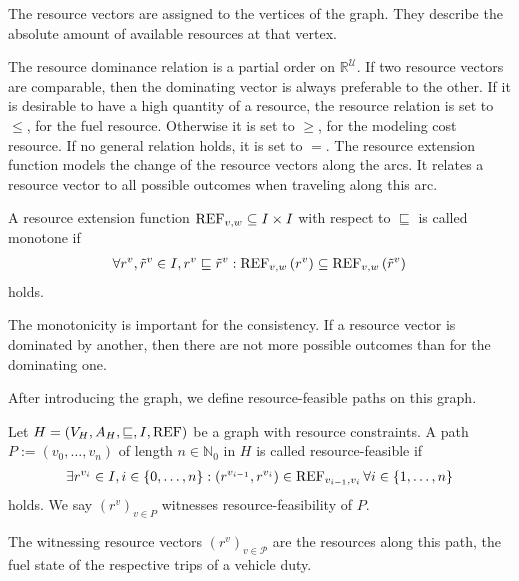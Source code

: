 The resource vectors are assigned to the vertices of the graph. They describe the absolute amount of available resources at that vertex.

The resource dominance relation is a partial order on $\mathbb{R}^{\mathcal{U}}$. If two resource vectors are comparable, then the dominating vector is always preferable to the other. If it is desirable to have a high quantity of a resource, the resource relation is set to $\leq$, \eg for the fuel resource. Otherwise it is set to $\geq$, \eg for the modeling cost resource. If no general relation holds, it is set to $=$. The resource extension function models the change of the resource vectors along the arcs. It relates a resource vector to all possible outcomes when traveling along this arc. 

\begin{definition}
\label{def:monotone_ref}

A resource extension function ${\operatorname{REF}_{v,w}\subseteq I\times I}$ with respect to $\sqsubseteq$ is called monotone if
\begin{align*}
	\forall r^v,\tilde{r}^v\in I, r^v\sqsubseteq\tilde{r}^v : \operatorname{REF}_{v,w}\left(r^v\right)\subseteq\operatorname{REF}_{v,w}\left(\tilde{r}^v\right)
\end{align*}
holds.

\end{definition}

The monotonicity is important for the consistency. If a resource vector is dominated by another, then there are not more possible outcomes than for the dominating one.

After introducing the graph, we define resource-feasible paths on this graph.

\begin{definition}

Let ${H=\left(V_H,A_H,\sqsubseteq,I,\operatorname{REF}\right)}$ be a graph with resource constraints. A path ${P:=\left(v_0,\dots,v_n\right)}$ of length ${n\in\mathbb{N}_0}$ in $H$ is called resource-feasible if
\begin{align*}
	\exists r^{v_i}\in I,i\in\{0,\dots,n\}: \left(r^{v_{i-1}},r^{v_i}\right)\in\operatorname{REF}_{v_{i-1},v_i} \forall i\in\{1,\dots,n\}
\end{align*}
holds. We say $\left(r^v\right)_{v\in P}$ witnesses resource-feasibility of $P$.

\end{definition}

The witnessing resource vectors $\left(r^v\right)_{v\in\mathcal{P}}$ are the resources along this path, \eg the fuel state of the respective trips of a vehicle duty.

